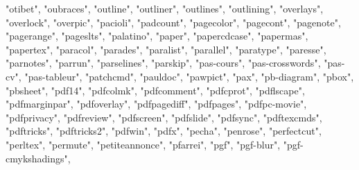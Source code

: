 \documentclass[
]{article}
\newenvironment{Shaded}{\begin{snugshade}}{\end{snugshade}}
\newcommand{\NormalTok}[1]{#1}
\newcommand{\StringTok}[1]{\textcolor[rgb]{0.31,0.60,0.02}{#1}}
\begin{document}
\begin{Shaded}
\begin{Highlighting}[]
\StringTok{"otibet"}\NormalTok{, }\StringTok{"oubraces"}\NormalTok{, }\StringTok{"outline"}\NormalTok{, }\StringTok{"outliner"}\NormalTok{, }\StringTok{"outlines"}\NormalTok{, }\StringTok{"outlining"}\NormalTok{, }
\StringTok{"overlays"}\NormalTok{, }\StringTok{"overlock"}\NormalTok{, }\StringTok{"overpic"}\NormalTok{, }\StringTok{"pacioli"}\NormalTok{, }\StringTok{"padcount"}\NormalTok{, }\StringTok{"pagecolor"}\NormalTok{, }
\StringTok{"pagecont"}\NormalTok{, }\StringTok{"pagenote"}\NormalTok{, }\StringTok{"pagerange"}\NormalTok{, }\StringTok{"pageslts"}\NormalTok{, }\StringTok{"palatino"}\NormalTok{, }
\StringTok{"paper"}\NormalTok{, }\StringTok{"papercdcase"}\NormalTok{, }\StringTok{"papermas"}\NormalTok{, }\StringTok{"papertex"}\NormalTok{, }\StringTok{"paracol"}\NormalTok{, }\StringTok{"parades"}\NormalTok{, }
\StringTok{"paralist"}\NormalTok{, }\StringTok{"parallel"}\NormalTok{, }\StringTok{"paratype"}\NormalTok{, }\StringTok{"paresse"}\NormalTok{, }\StringTok{"parnotes"}\NormalTok{, }\StringTok{"parrun"}\NormalTok{, }
\StringTok{"parselines"}\NormalTok{, }\StringTok{"parskip"}\NormalTok{, }\StringTok{"pas{-}cours"}\NormalTok{, }\StringTok{"pas{-}crosswords"}\NormalTok{, }\StringTok{"pas{-}cv"}\NormalTok{, }
\StringTok{"pas{-}tableur"}\NormalTok{, }\StringTok{"patchcmd"}\NormalTok{, }\StringTok{"pauldoc"}\NormalTok{, }\StringTok{"pawpict"}\NormalTok{, }\StringTok{"pax"}\NormalTok{, }\StringTok{"pb{-}diagram"}\NormalTok{, }
\StringTok{"pbox"}\NormalTok{, }\StringTok{"pbsheet"}\NormalTok{, }\StringTok{"pdf14"}\NormalTok{, }\StringTok{"pdfcolmk"}\NormalTok{, }\StringTok{"pdfcomment"}\NormalTok{, }\StringTok{"pdfcprot"}\NormalTok{, }
\StringTok{"pdflscape"}\NormalTok{, }\StringTok{"pdfmarginpar"}\NormalTok{, }\StringTok{"pdfoverlay"}\NormalTok{, }\StringTok{"pdfpagediff"}\NormalTok{, }\StringTok{"pdfpages"}\NormalTok{, }
\StringTok{"pdfpc{-}movie"}\NormalTok{, }\StringTok{"pdfprivacy"}\NormalTok{, }\StringTok{"pdfreview"}\NormalTok{, }\StringTok{"pdfscreen"}\NormalTok{, }\StringTok{"pdfslide"}\NormalTok{, }
\StringTok{"pdfsync"}\NormalTok{, }\StringTok{"pdftexcmds"}\NormalTok{, }\StringTok{"pdftricks"}\NormalTok{, }\StringTok{"pdftricks2"}\NormalTok{, }\StringTok{"pdfwin"}\NormalTok{, }
\StringTok{"pdfx"}\NormalTok{, }\StringTok{"pecha"}\NormalTok{, }\StringTok{"penrose"}\NormalTok{, }\StringTok{"perfectcut"}\NormalTok{, }\StringTok{"perltex"}\NormalTok{, }\StringTok{"permute"}\NormalTok{, }
\StringTok{"petiteannonce"}\NormalTok{, }\StringTok{"pfarrei"}\NormalTok{, }\StringTok{"pgf"}\NormalTok{, }\StringTok{"pgf{-}blur"}\NormalTok{, }\StringTok{"pgf{-}cmykshadings"}\NormalTok{, }

\end{Highlighting}
\end{Shaded}
\end{document}
